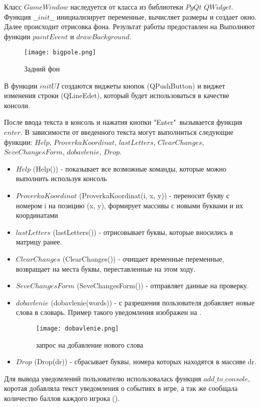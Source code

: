 \documentclass[a4paper,14pt]{article}
\begin{document}
	Класс $GameWindow$ наследуется от класса из библиотеки $PyQt$ $QWidget$.	
	Функция $\_\_init\_\_$  инициализирует переменные, вычисляет размеры и создает окно.	
	Далее происходит отрисовка фона.
	Результат работы предоставлен на 
	Выполняют функции $paintEvent$ и $drawBackground$.
	\begin{figure}[H]
		\centering
		\texttt{[image: bigpole.png]}
		\caption{Задний фон}
		\label{img:background}
	\end{figure}
	
	В функции $initUI$ создаются виджеты кнопок (QPushButton) и виджет изменения строки (QLineEdet), который будет использоваться в качестве консоли.
		
	После ввода текста в консоль и нажатия кнопки "Enter"\ вызывается функция $enter$.
	В зависимости от введенного текста могут выполниться следующие функции: $Help$, $ProverkaKoordinat$,  $lastLetters$,  $ClearChanges$, $SeveChangesForm$, $dobavlenie$, $Drop$.
	
	\begin {itemize}
	\item $Help$ (Help()) - показывает все возможные команды, которые можно выполнить используя консоль
	\item $ProverkaKoordinat$ (ProverkaKoordinat(i, x, y)) - переносит букву с номером i на позицию (x, y), формирует массивы с новыми буквами и их координатами	
	\item $lastLetters$ (lastLetters()) - отрисовывает буквы, которые вносились в матрицу ранее.
	\item $ClearChanges$ (ClearChanges()) - очищает временные переменные, возвращает на места буквы, переставленные на этом ходу.
	\item $SeveChangesForm$ (SeveChangesForm()) - отправляет данные на проверку.
	\item $dobavlenie$ (dobavlenie(words)) - с разрешения пользователя добавляет новые слова в словарь. Пример такого уведомления изображен на .
	\begin{figure}[bhtp]
		\centering
		\texttt{[image: dobavlenie.png]}
		\caption{запрос на добавление нового слова}
		\label{img:dob}
	\end{figure}
	\item $Drop$ (Drop(dr)) - сбрасывает буквы, номера которых находятся в массиве dr.
	\end {itemize}
	
	Для вывода уведомлений пользователю использовалась функция $add\_to\_console$, коротая добавляла текст уведомления о событиях в игре, а так же сообщала количество баллов каждого игрока ().
\end{document}
